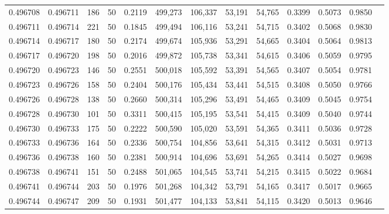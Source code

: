 \begin{tabular}{rrrrrrrrrrrrr}
0.496708 & 0.496711 &   186 &  50 &                                     0.2119 & 499,273 & 106,337 &  53,191 &  54,765 & 0.3399 & 0.5073 & 0.9850 \\
0.496711 & 0.496714 &   221 &  50 &                                     0.1845 & 499,494 & 106,116 &  53,241 &  54,715 & 0.3402 & 0.5068 & 0.9830 \\
0.496714 & 0.496717 &   180 &  50 &                                     0.2174 & 499,674 & 105,936 &  53,291 &  54,665 & 0.3404 & 0.5064 & 0.9813 \\
0.496717 & 0.496720 &   198 &  50 &                                     0.2016 & 499,872 & 105,738 &  53,341 &  54,615 & 0.3406 & 0.5059 & 0.9795 \\
0.496720 & 0.496723 &   146 &  50 &                                     0.2551 & 500,018 & 105,592 &  53,391 &  54,565 & 0.3407 & 0.5054 & 0.9781 \\
0.496723 & 0.496726 &   158 &  50 &                                     0.2404 & 500,176 & 105,434 &  53,441 &  54,515 & 0.3408 & 0.5050 & 0.9766 \\
0.496726 & 0.496728 &   138 &  50 &                                     0.2660 & 500,314 & 105,296 &  53,491 &  54,465 & 0.3409 & 0.5045 & 0.9754 \\
0.496728 & 0.496730 &   101 &  50 &                                     0.3311 & 500,415 & 105,195 &  53,541 &  54,415 & 0.3409 & 0.5040 & 0.9744 \\
0.496730 & 0.496733 &   175 &  50 &                                     0.2222 & 500,590 & 105,020 &  53,591 &  54,365 & 0.3411 & 0.5036 & 0.9728 \\
0.496733 & 0.496736 &   164 &  50 &                                     0.2336 & 500,754 & 104,856 &  53,641 &  54,315 & 0.3412 & 0.5031 & 0.9713 \\
0.496736 & 0.496738 &   160 &  50 &                                     0.2381 & 500,914 & 104,696 &  53,691 &  54,265 & 0.3414 & 0.5027 & 0.9698 \\
0.496738 & 0.496741 &   151 &  50 &                                     0.2488 & 501,065 & 104,545 &  53,741 &  54,215 & 0.3415 & 0.5022 & 0.9684 \\
0.496741 & 0.496744 &   203 &  50 &                                     0.1976 & 501,268 & 104,342 &  53,791 &  54,165 & 0.3417 & 0.5017 & 0.9665 \\
0.496744 & 0.496747 &   209 &  50 &                                     0.1931 & 501,477 & 104,133 &  53,841 &  54,115 & 0.3420 & 0.5013 & 0.9646 \\

\end{tabular}
